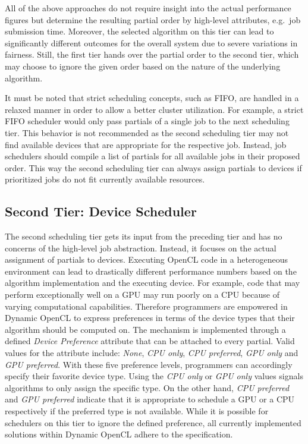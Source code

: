 All of the above approaches do not require insight into the actual performance figures but determine the resulting partial order by high-level attributes, e.g.~job submission time. Moreover, the selected algorithm on this tier can lead to significantly different outcomes for the overall system due to severe variations in fairness. Still, the first tier hands over the partial order to the second tier, which may choose to ignore the given order based on the nature of the underlying algorithm.

It must be noted that strict scheduling concepts, such as FIFO, are handled in a relaxed manner in order to allow a better cluster utilization. For example, a strict FIFO scheduler would only pass partials of a single job to the next scheduling tier. This behavior is not recommended as the second scheduling tier may not find available devices that are appropriate for the respective job. Instead, job schedulers should compile a list of partials for all available jobs in their proposed order. This way the second scheduling tier can always assign partials to devices if prioritized jobs do not fit currently available resources.

\subsection{Second Tier: Device Scheduler}
The second scheduling tier gets its input from the preceding tier and has no concerns of the high-level job abstraction. Instead, it focuses on the actual assignment of partials to devices. Executing OpenCL code in a heterogeneous environment can lead to drastically different performance numbers based on the algorithm implementation and the executing device. For example, code that may perform exceptionally well on a GPU may run poorly on a CPU because of varying computational capabilities. Therefore programmers are empowered in Dynamic OpenCL to express preferences in terms of the device types that their algorithm should be computed on. The mechanism is implemented through a defined \textit{Device Preference} attribute that can be attached to every partial. Valid values for the attribute include: \textit{None}, \textit{CPU only}, \textit{CPU preferred}, \textit{GPU only} and \textit{GPU preferred}. With these five preference levels, programmers can accordingly specify their favorite device type. Using the \textit{CPU only} or \textit{GPU only} values signals algorithms to only assign the specific type. On the other hand, \textit{CPU preferred} and \textit{GPU preferred} indicate that it is appropriate to schedule a GPU or a CPU respectively if the preferred type is not available. While it is possible for schedulers on this tier to ignore the defined preference, all currently implemented solutions within Dynamic OpenCL adhere to the specification.

